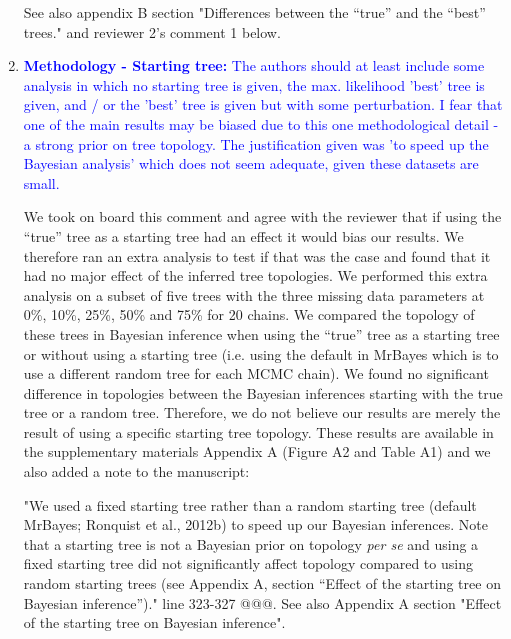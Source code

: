 \documentclass[12pt,letterpaper]{article}
\begin{document}
\begin{enumerate}
See also appendix B section "Differences between the ``true'' and the ``best'' trees." and reviewer 2's comment 1 below.


\item{\textcolor{blue}{\textbf{Methodology - Starting tree:} The authors should at least include some analysis in which no starting tree is given, the max. likelihood 'best' tree is given, and / or the 'best' tree is given but with some perturbation.
I fear that one of the main results may be biased due to this one methodological detail - a strong prior on tree topology.
The justification given was 'to speed up the Bayesian analysis' which does not seem adequate, given these datasets are small.}}


We took on board this comment and agree with the reviewer that if using the ``true'' tree as a starting tree had an effect it would bias our results.
We therefore ran an extra analysis to test if that was the case and found that it had no major effect of the inferred tree topologies.
We performed this extra analysis on a subset of five trees with the three missing data parameters at 0\%, 10\%, 25\%, 50\% and 75\% for 20 chains. 
We compared the topology of these trees in Bayesian inference when using the ``true'' tree as a starting tree or without using a starting tree (i.e. using the default in MrBayes which is to use a different random tree for each MCMC chain).
We found no significant difference in topologies between the Bayesian inferences starting with the true tree or a random tree.
Therefore, we do not believe our results are merely the result of using a specific starting tree topology.
These results are available in the supplementary materials Appendix A (Figure A2 and Table A1) and we also added a note to the manuscript:

"We used a fixed starting tree rather than a random starting tree (default MrBayes; Ronquist et al., 2012b) to speed up our Bayesian inferences.
Note that a starting tree is not a Bayesian prior on topology \textit{per se} and using a fixed starting tree did not significantly affect topology compared to using random starting trees (see Appendix A, section ``Effect of the starting tree on Bayesian inference'')." line 323-327 @@@.
See also Appendix A section "Effect of the starting tree on Bayesian inference".



\end{enumerate}
\end{document}
